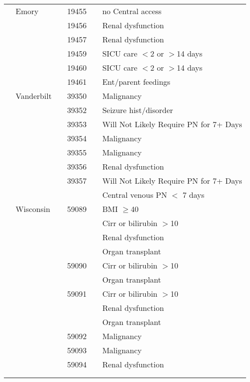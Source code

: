 \documentclass[dvips,10pt]{article}
\begin{document}
\begin{table}[t]
\begin{center}
\begin{tabular}{ @{}l@{}
@{}l@{}@{}p{1.5em}@{}@{}c@{}@{}p{1.5em}@{}@{}l@{}
}
\\
& Emory && 19455 && no Central access \\
&  && 19456 && Renal dysfunction \\
&  && 19457 && Renal dysfunction \\
&  && 19459 && SICU care $<$2 or $>$14 days \\
&  && 19460 && SICU care $<$2 or $>$14 days \\
&  && 19461 && Ent/parent feedings \\
& Vanderbilt && 39350 && Malignancy \\
&  && 39352 && Seizure hist/disorder \\
&  && 39353 && Will Not Likely Require PN for 7+ Days \\
&  && 39354 && Malignancy \\
&  && 39355 && Malignancy \\
&  && 39356 && Renal dysfunction \\
&  && 39357 && Will Not Likely Require PN for 7+ Days \\
&  &&  && Central venous PN $<$ 7 days \\
& Wisconsin && 59089 && BMI $ \ge $40 \\
&  &&  && Cirr or bilirubin $>$10 \\
&  &&  && Renal dysfunction \\
&  &&  && Organ transplant \\
&  && 59090 && Cirr or bilirubin $>$10 \\
&  &&  && Organ transplant \\
&  && 59091 && Cirr or bilirubin $>$10 \\
&  &&  && Renal dysfunction \\
&  &&  && Organ transplant \\
&  && 59092 && Malignancy \\
&  && 59093 && Malignancy \\
&  && 59094 && Renal dysfunction \\
\\
\hline \\

\end{tabular}

\end{center}
 \end{table}
\clearpage
\clearpage
\end{document}
